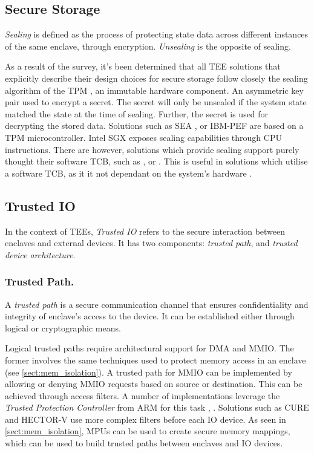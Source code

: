 \documentclass[runningheads,a4paper]{uwsese}
\begin{document}
\subsection{Secure Storage}

\emph{Sealing} is defined as the process of protecting state data across
different instances of the same enclave, through encryption. \emph{Unsealing}
is the opposite of sealing.

As a result of the survey, it's been determined that all \gls{TEE} solutions
that explicitly describe their design choices for secure storage follow closely
the sealing algorithm of the \gls{TPM} \cite{trust_plat_mod}, an immutable
hardware component. An asymmetric key pair used to encrypt a secret. The secret
will only be unsealed if the system state matched the state at the time of
sealing. Further, the secret is used for decrypting the stored data. Solutions
such as SEA \cite{sea_minimal_tcb}, or IBM-PEF \cite{ibm_pef} are based on a
\gls{TPM} microcontroller. Intel SGX \cite{intel_sgx} exposes sealing
capabilities through \gls{CPU} instructions. There are however, solutions which
provide sealing support purely thought their software \gls{TCB}, such as
\cite{optee}, or \cite{tee_timber}. This is useful in solutions which utilise a
software \gls{TCB}, as it it not dependant on the system's hardware
\cite{tee_hw_sup}.

\subsection{Trusted IO}

In the context of \glspl{TEE}, \emph{Trusted IO} refers to the secure
interaction between enclaves and external devices. It has two components:
\emph{trusted path}, and \emph{trusted device architecture}.

\subsubsection{Trusted Path.}

A \emph{trusted path} is a secure communication channel that ensures
confidentiality and integrity of enclave's access to the device. It can be
established either through logical or cryptographic means.

Logical trusted paths require architectural support for \gls{DMA} and
\gls{MMIO}. The former involves the same techniques used to protect memory
access in an enclave (see \ref{sect:mem_isolation}). A trusted path for \gls{MMIO}
can be implemented by allowing or denying \gls{MMIO} requests based on source
or destination. This can be achieved through access filters. A number of
implementations leverage the \emph{Trusted Protection Controller} from ARM for
this task \cite{tee_truz_droid}, \cite{tee_vbutton}. Solutions such as CURE
\cite{tee_cure} and HECTOR-V \cite{tee_hector_v} use more complex filters
before each IO device. As seen in \ref{sect:mem_isolation}, \glspl{MPU} can be used
to create secure memory mappings, which can be used to build trusted paths
between enclaves and IO devices.
\end{document}
